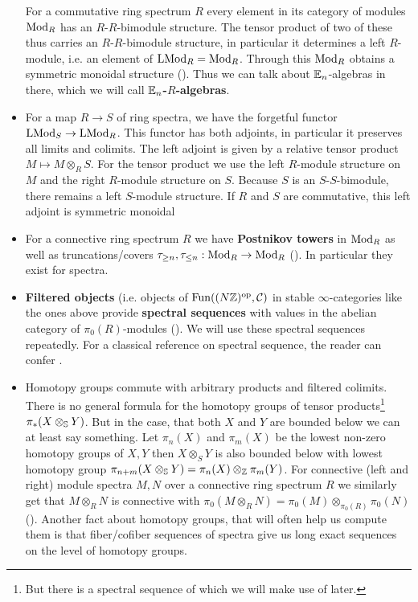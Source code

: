 \begin{itemize}
    For a commutative ring spectrum $R$ every element in its category of modules $\Mod_R$ has an $R$-$R$-bimodule structure. The tensor product of two of these thus carries an $R$-$R$-bimodule structure, in particular it determines a left $R$-module, i.e. an element of $\LMod_R= \Mod_R$. Through this $\Mod_R$ obtains a symmetric monoidal structure (\cite[Theorem~4.5.2.1]{lurie2017higher}). Thus we can talk about $\En$-algebras in there, which we will call \textbf{$\En$-$R$-algebras}.
    \item For a map $R\to S$ of ring spectra, we have the forgetful functor $\LMod_S\to \LMod_R$. This functor has both adjoints, in particular it preserves all limits and colimits. The left adjoint is given by a relative tensor product $M\mapsto M\otimes_R S$. For the tensor product we use the left $R$-module structure on $M$ and the right $R$-module structure on $S$. Because $S$ is an $S$-$S$-bimodule, there remains a left $S$-module structure. If $R$ and $S$ are commutative, this left adjoint is symmetric monoidal \cite[Section~4.5.3]{lurie2017higher}
    \item For a connective ring spectrum $R$ we have \textbf{Postnikov towers} in $\Mod_R$ as well as truncations/covers $\tau_{\geq n},\tau_{\leq n}:\Mod_R\to \Mod_R$ (\cite[Proposition~7.1.1.13]{lurie2017higher}). In particular they exist for spectra.
    \item \textbf{Filtered objects} (i.e. objects of $\Fun((N\Z)^{\op},\cC)$ in stable $\infty$-categories like the ones above provide \textbf{spectral sequences} with values in the abelian category of $\pi_0(R)$-modules (\cite[Section~1.2.2]{lurie2017higher}). 
    We will use these spectral sequences repeatedly.
    For a classical reference on spectral sequence, the reader can confer \cite[Chapter~5]{weibel1994introduction}.
    \item Homotopy groups commute with arbitrary products and filtered colimits. There is no general formula for the homotopy groups of tensor products\footnote{But there is a spectral sequence of which we will make use of later.} $\pi_*(X\otimes_\S Y)$. 
    But in the case, that both $X$ and $Y$ are bounded below we can at least say something. Let $\pi_n(X)$ and $\pi_m(X)$ be the lowest non-zero homotopy groups of $X,Y$ then $X\otimes_S Y$ is also bounded below with lowest homotopy group $\pi_{n+m}(X\otimes_\S Y)=\pi_n(X)\otimes_\Z\pi_m(Y)$. 
    For connective (left and right) module spectra $M,N$ over a connective ring spectrum $R$ we similarly get that $M\otimes_R N$ is connective with $\pi_0(M\otimes_R N)=\pi_0(M)\otimes_{\pi_0(R)}\pi_0(N)$ (\cite[Corollary~7.2.1.23]{lurie2017higher}). Another fact about homotopy groups, that will often help us compute them is that fiber/cofiber sequences of spectra give us long exact sequences on the level of homotopy groups.

\end{itemize}
